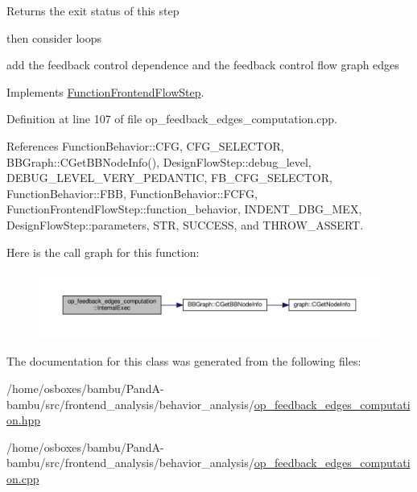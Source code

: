 \begin{DoxyReturn}{Returns}
the exit status of this step 
\end{DoxyReturn}
then consider loops

add the feedback control dependence and the feedback control flow graph edges 

Implements \hyperlink{classFunctionFrontendFlowStep_a00612f7fb9eabbbc8ee7e39d34e5ac68}{Function\+Frontend\+Flow\+Step}.



Definition at line 107 of file op\+\_\+feedback\+\_\+edges\+\_\+computation.\+cpp.



References Function\+Behavior\+::\+C\+FG, C\+F\+G\+\_\+\+S\+E\+L\+E\+C\+T\+OR, B\+B\+Graph\+::\+C\+Get\+B\+B\+Node\+Info(), Design\+Flow\+Step\+::debug\+\_\+level, D\+E\+B\+U\+G\+\_\+\+L\+E\+V\+E\+L\+\_\+\+V\+E\+R\+Y\+\_\+\+P\+E\+D\+A\+N\+T\+IC, F\+B\+\_\+\+C\+F\+G\+\_\+\+S\+E\+L\+E\+C\+T\+OR, Function\+Behavior\+::\+F\+BB, Function\+Behavior\+::\+F\+C\+FG, Function\+Frontend\+Flow\+Step\+::function\+\_\+behavior, I\+N\+D\+E\+N\+T\+\_\+\+D\+B\+G\+\_\+\+M\+EX, Design\+Flow\+Step\+::parameters, S\+TR, S\+U\+C\+C\+E\+SS, and T\+H\+R\+O\+W\+\_\+\+A\+S\+S\+E\+RT.

Here is the call graph for this function\+:
\nopagebreak
\begin{figure}[H]
\begin{center}
\leavevmode
\includegraphics[width=350pt]{d4/d6d/classop__feedback__edges__computation_aea1d74075f6fed53eaf6b8829ec400e1_cgraph}
\end{center}
\end{figure}


The documentation for this class was generated from the following files\+:\begin{DoxyCompactItemize}
\item 
/home/osboxes/bambu/\+Pand\+A-\/bambu/src/frontend\+\_\+analysis/behavior\+\_\+analysis/\hyperlink{op__feedback__edges__computation_8hpp}{op\+\_\+feedback\+\_\+edges\+\_\+computation.\+hpp}\item 
/home/osboxes/bambu/\+Pand\+A-\/bambu/src/frontend\+\_\+analysis/behavior\+\_\+analysis/\hyperlink{op__feedback__edges__computation_8cpp}{op\+\_\+feedback\+\_\+edges\+\_\+computation.\+cpp}\end{DoxyCompactItemize}
